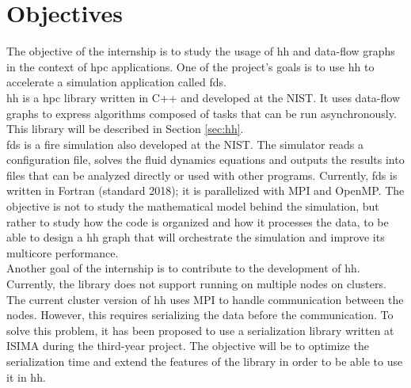 
\clearpage
\section{Objectives}

The objective of the internship is to study the usage of \gls{hh} and data-flow
graphs in the context of \gls{hpc} applications. One of the project's goals is
to use \gls{hh} to accelerate a simulation application called \gls{fds}.\\

\gls{hh} is a \gls{hpc} library written in C++ and developed at the NIST. It
uses data-flow graphs to express algorithms composed of tasks that can be run
asynchronously. This library will be described in Section \ref{sec:hh}.\\

\gls{fds} is a fire simulation also developed at the NIST. The simulator reads a
configuration file, solves the fluid dynamics equations and outputs the results
into files that can be analyzed directly or used with other programs. Currently,
\gls{fds} is written in Fortran (standard 2018); it is parallelized with MPI and
OpenMP. The objective is not to study the mathematical model behind the
simulation, but rather to study how the code is organized and how it processes
the data, to be able to design a \gls{hh} graph that will orchestrate the
simulation and improve its multicore performance.\\

Another goal of the internship is to contribute to the development of \gls{hh}.
Currently, the library does not support running on multiple nodes on clusters.
The current cluster version of \gls{hh} uses MPI to handle communication between
the nodes. However, this requires serializing the data before the communication.
To solve this problem, it has been proposed to use a serialization library
written at ISIMA during the third-year project. The objective will be to
optimize the serialization time and extend the features of the library in order
to be able to use it in \gls{hh}.

